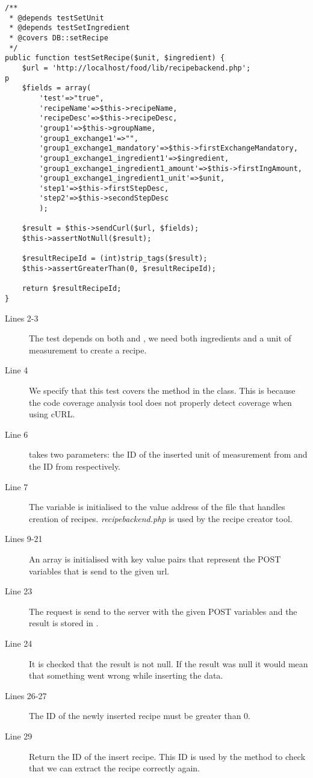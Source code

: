 \begin{lstlisting}[language=phpstyle]
/**
 * @depends testSetUnit
 * @depends testSetIngredient
 * @covers DB::setRecipe
 */
public function testSetRecipe($unit, $ingredient) {
    $url = 'http://localhost/food/lib/recipebackend.php';
p
    $fields = array(
        'test'=>"true",
        'recipeName'=>$this->recipeName,
        'recipeDesc'=>$this->recipeDesc,
        'group1'=>$this->groupName,
        'group1_exchange1'=>"",
        'group1_exchange1_mandatory'=>$this->firstExchangeMandatory,
        'group1_exchange1_ingredient1'=>$ingredient,
        'group1_exchange1_ingredient1_amount'=>$this->firstIngAmount,
        'group1_exchange1_ingredient1_unit'=>$unit,
        'step1'=>$this->firstStepDesc,
        'step2'=>$this->secondStepDesc
        );
    
    $result = $this->sendCurl($url, $fields);
    $this->assertNotNull($result);
        
    $resultRecipeId = (int)strip_tags($result);
    $this->assertGreaterThan(0, $resultRecipeId);
    
    return $resultRecipeId;
}
\end{lstlisting}

\begin{description}
\item[Lines 2-3] The test depends on both  and , we need both ingredients and a unit of measurement to create a recipe.
\item[Line 4] We specify that this test covers the  method in the  class. This is because the code coverage analysis tool does not properly detect coverage when using cURL.
\item[Line 6]  takes two parameters: the ID of the inserted unit of measurement from  and the ID from  respectively.
\item[Line 7] The  variable is initialised to the value address of the file that handles creation of recipes. \textit{recipebackend.php} is used by the recipe creator tool.%
\item[Lines 9-21] An array is initialised with key value pairs that represent the POST variables that is send to the given url.
\item[Line 23] The request is send to the server with the given POST variables and the result is stored in .%
\item[Line 24] It is checked that the result is not null. If the result was null it would mean that something went wrong while inserting the data.
\item[Lines 26-27] The ID of the newly inserted recipe must be greater than 0.
\item[Line 29] Return the ID of the insert recipe. This ID is used by the \linebreak{} method to check that we can extract the recipe correctly again.
\end{description}

